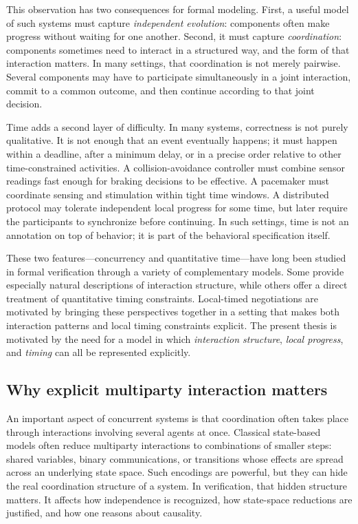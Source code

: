 This observation has two consequences for formal modeling. First, a useful model of such systems must capture \emph{independent evolution}: components often make progress without waiting for one another. Second, it must capture \emph{coordination}: components sometimes need to interact in a structured way, and the form of that interaction matters. In many settings, that coordination is not merely pairwise. Several components may have to participate simultaneously in a joint interaction, commit to a common outcome, and then continue according to that joint decision.

Time adds a second layer of difficulty. In many systems, correctness is not purely qualitative. It is not enough that an event eventually happens; it must happen within a deadline, after a minimum delay, or in a precise order relative to other time-constrained activities. A collision-avoidance controller must combine sensor readings fast enough for braking decisions to be effective. A pacemaker must coordinate sensing and stimulation within tight time windows. A distributed protocol may tolerate independent local progress for some time, but later require the participants to synchronize before continuing. In such settings, time is not an annotation on top of behavior; it is part of the behavioral specification itself.

These two features—concurrency and quantitative time—have long been studied in formal verification through a variety of complementary models. Some provide especially natural descriptions of interaction structure, while others offer a direct treatment of quantitative timing constraints. Local-timed negotiations are motivated by bringing these perspectives together in a setting that makes both interaction patterns and local timing constraints explicit. The present thesis is motivated by the need for a model in which \emph{interaction structure}, \emph{local progress}, and \emph{timing} can all be represented explicitly.

\subsection{Why explicit multiparty interaction matters}

An important aspect of concurrent systems is that coordination often takes place
through interactions involving several agents at once. Classical state-based models often reduce multiparty interactions to combinations of smaller steps: shared variables, binary communications, or transitions whose effects are spread across an underlying state space. Such encodings are powerful, but they can hide the real coordination structure of a system. In verification, that hidden structure matters. It affects how independence is recognized, how state-space reductions are justified, and how one reasons about causality.

